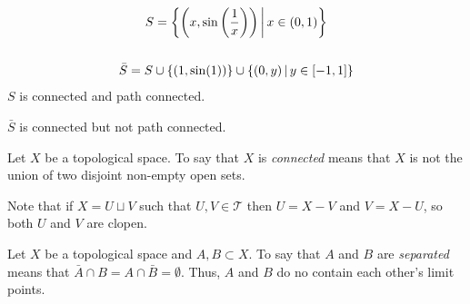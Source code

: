 \documentclass[letterpaper,12pt,fleqn]{article}
\newcommand{\T}{\mathscr{T}}
\begin{document}
\begin{example}
  \begin{gather*}
    S=\left\{{\left(x,\sin\left(\frac{1}{x}\right)\right)}\,\middle|\,{x\in(0,1)}\right\} \\
    \\
    \bar{S}=S\cup\{(1,\sin(1))\}\cup\left\{{(0,y)}\,\middle|\,{y\in[-1,1]}\right\}
  \end{gather*}
  \(S\) is connected and path connected.

  \(\bar{S}\) is connected but not path connected.
\end{example}

\begin{definition}[Connected]
  Let \(X\) be a topological space.  To say that \(X\) is \emph{connected} means that \(X\) is not the union of two
  disjoint non-empty open sets.
\end{definition}

Note that if \(X=U\sqcup V\) such that \(U,V\in\T\) then \(U=X-V\) and \(V=X-U\), so both \(U\) and \(V\) are
clopen.

\begin{definition}[Separated]
  Let \(X\) be a topological space and \(A,B\subset X\).  To say that \(A\) and \(B\) are \emph{separated} means
  that \(\bar{A}\cap B=A\cap\bar{B}=\emptyset\).  Thus, \(A\) and \(B\) do no contain each other's limit points.
\end{definition}
\end{document}
